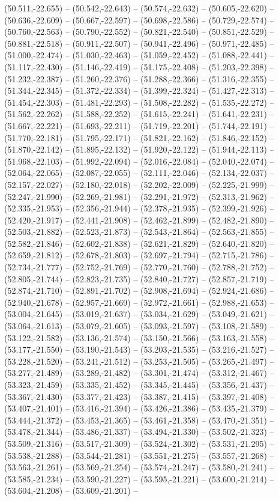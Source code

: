 (50.511,-22.655) -- (50.542,-22.643) -- (50.574,-22.632) -- (50.605,-22.620) -- (50.636,-22.609) -- (50.667,-22.597) -- (50.698,-22.586) -- (50.729,-22.574) -- (50.760,-22.563) -- (50.790,-22.552) -- (50.821,-22.540) -- (50.851,-22.529) -- (50.881,-22.518) -- (50.911,-22.507) -- (50.941,-22.496) -- (50.971,-22.485) -- (51.000,-22.474) -- (51.030,-22.463) -- (51.059,-22.452) -- (51.088,-22.441) -- (51.117,-22.430) -- (51.146,-22.419) -- (51.175,-22.408) -- (51.203,-22.398) -- (51.232,-22.387) -- (51.260,-22.376) -- (51.288,-22.366) -- (51.316,-22.355) -- (51.344,-22.345) -- (51.372,-22.334) -- (51.399,-22.324) -- (51.427,-22.313) -- (51.454,-22.303) -- (51.481,-22.293) -- (51.508,-22.282) -- (51.535,-22.272) -- (51.562,-22.262) -- (51.588,-22.252) -- (51.615,-22.241) -- (51.641,-22.231) -- (51.667,-22.221) -- (51.693,-22.211) -- (51.719,-22.201) -- (51.744,-22.191) -- (51.770,-22.181) -- (51.795,-22.171) -- (51.821,-22.162) -- (51.846,-22.152) -- (51.870,-22.142) -- (51.895,-22.132) -- (51.920,-22.122) -- (51.944,-22.113) -- (51.968,-22.103) -- (51.992,-22.094) -- (52.016,-22.084) -- (52.040,-22.074) -- (52.064,-22.065) -- (52.087,-22.055) -- (52.111,-22.046) -- (52.134,-22.037) -- (52.157,-22.027) -- (52.180,-22.018) -- (52.202,-22.009) -- (52.225,-21.999) -- (52.247,-21.990) -- (52.269,-21.981) -- (52.291,-21.972) -- (52.313,-21.962) -- (52.335,-21.953) -- (52.356,-21.944) -- (52.378,-21.935) -- (52.399,-21.926) -- (52.420,-21.917) -- (52.441,-21.908) -- (52.462,-21.899) -- (52.482,-21.890) -- (52.503,-21.882) -- (52.523,-21.873) -- (52.543,-21.864) -- (52.563,-21.855) -- (52.582,-21.846) -- (52.602,-21.838) -- (52.621,-21.829) -- (52.640,-21.820) -- (52.659,-21.812) -- (52.678,-21.803) -- (52.697,-21.794) -- (52.715,-21.786) -- (52.734,-21.777) -- (52.752,-21.769) -- (52.770,-21.760) -- (52.788,-21.752) -- (52.805,-21.744) -- (52.823,-21.735) -- (52.840,-21.727) -- (52.857,-21.719) -- (52.874,-21.710) -- (52.891,-21.702) -- (52.908,-21.694) -- (52.924,-21.686) -- (52.940,-21.678) -- (52.957,-21.669) -- (52.972,-21.661) -- (52.988,-21.653) -- (53.004,-21.645) -- (53.019,-21.637) -- (53.034,-21.629) -- (53.049,-21.621) -- (53.064,-21.613) -- (53.079,-21.605) -- (53.093,-21.597) -- (53.108,-21.589) -- (53.122,-21.582) -- (53.136,-21.574) -- (53.150,-21.566) -- (53.163,-21.558) -- (53.177,-21.550) -- (53.190,-21.543) -- (53.203,-21.535) -- (53.216,-21.527) -- (53.228,-21.520) -- (53.241,-21.512) -- (53.253,-21.505) -- (53.265,-21.497) -- (53.277,-21.489) -- (53.289,-21.482) -- (53.301,-21.474) -- (53.312,-21.467) -- (53.323,-21.459) -- (53.335,-21.452) -- (53.345,-21.445) -- (53.356,-21.437) -- (53.367,-21.430) -- (53.377,-21.423) -- (53.387,-21.415) -- (53.397,-21.408) -- (53.407,-21.401) -- (53.416,-21.394) -- (53.426,-21.386) -- (53.435,-21.379) -- (53.444,-21.372) -- (53.453,-21.365) -- (53.461,-21.358) -- (53.470,-21.351) -- (53.478,-21.344) -- (53.486,-21.337) -- (53.494,-21.330) -- (53.502,-21.323) -- (53.509,-21.316) -- (53.517,-21.309) -- (53.524,-21.302) -- (53.531,-21.295) -- (53.538,-21.288) -- (53.544,-21.281) -- (53.551,-21.275) -- (53.557,-21.268) -- (53.563,-21.261) -- (53.569,-21.254) -- (53.574,-21.247) -- (53.580,-21.241) -- (53.585,-21.234) -- (53.590,-21.227) -- (53.595,-21.221) -- (53.600,-21.214) -- (53.604,-21.208) -- (53.609,-21.201) -- 